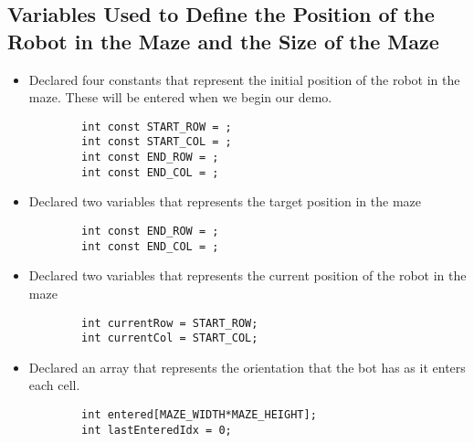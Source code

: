 \documentclass[11pt]{article}
\begin{document}
\subsection{Variables Used to Define the Position of the Robot in the Maze and the Size of the Maze}
\begin{itemize}
\item Declared four constants that represent the initial position of the robot in the maze. These will be entered when we begin our demo.
	\begin{verbatim}
		int const START_ROW = ;
		int const START_COL = ;
		int const END_ROW = ; 
		int const END_COL = ;
	\end{verbatim} 
\item Declared two variables that represents the target position in the maze
	\begin{verbatim}
		int const END_ROW = ; 
		int const END_COL = ;
	\end{verbatim}
\item Declared two variables that represents the current position of the robot in the maze 
	\begin{verbatim}
		int currentRow = START_ROW;
		int currentCol = START_COL;
	\end{verbatim} 
\item Declared an array that represents the orientation that the bot has as it enters each cell. 
	\begin{verbatim}
		int entered[MAZE_WIDTH*MAZE_HEIGHT];
		int lastEnteredIdx = 0;
	\end{verbatim} 
\end{itemize}
\newpage
\end{document}
